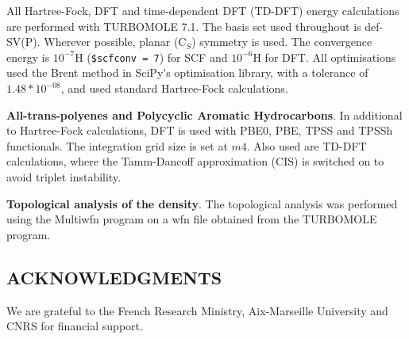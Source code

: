 \documentclass[12pt]{article}
\begin{document}
All Hartree-Fock, DFT and time-dependent DFT (TD-DFT) energy calculations are performed with TURBOMOLE 7.1.\cite{TURBOMOLE} The basis set used throughout is def-SV(P).\cite{defsvp} Wherever possible, planar (C\(_{S}\)) symmetry is used. The convergence energy is \(10^{-7}\)H (\texttt{\$scfconv = 7}) for SCF and \(10^{-6}\)H for DFT. All optimisations used the Brent method in SciPy's optimisation library, with a tolerance of \(1.48*10^{-08}\), and used standard Hartree-Fock calculations.\cite{scipy}

\textbf{All-trans-polyenes and Polycyclic Aromatic Hydrocarbons}. In additional to Hartree-Fock calculations, DFT is used with PBE0, PBE, TPSS and TPSSh functionals.\cite{pbe0,pbe,tpss,tpssh} The integration grid size is set at \(m4\). Also used are TD-DFT calculations, where the Tamm-Dancoff approximation (CIS) is switched on to avoid triplet instability.\cite{tammdancoff}

\textbf{Topological analysis of the density}. The topological analysis was performed using the Multiwfn
program on a wfn file obtained from the TURBOMOLE program.\cite{multiwfn}

\subsection*{\sffamily \large ACKNOWLEDGMENTS}
We are grateful to the French Research Ministry, Aix-Marseille University and CNRS for financial support.
\clearpage



%
%
\end{document}
